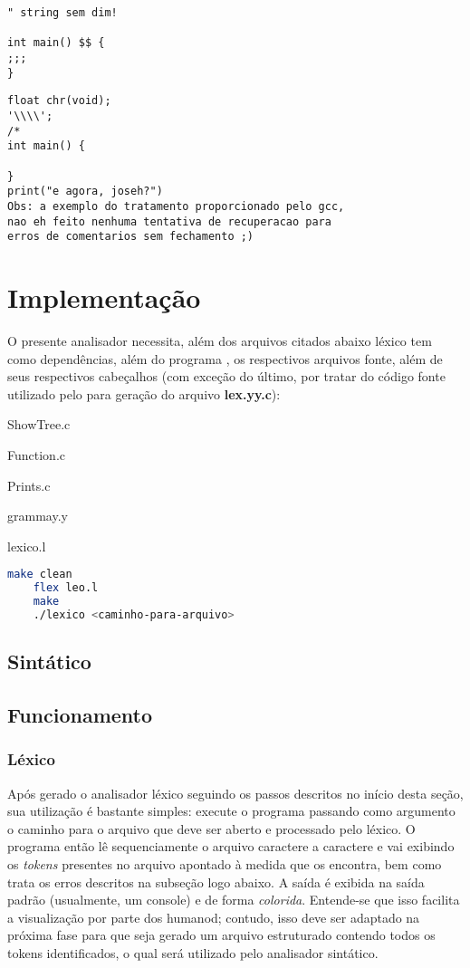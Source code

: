 \documentclass[
	article,			%
	11pt,				%
	oneside,			%
	a4paper,			%
	english,			%
	brazil,				%
	sumario=tradicional
	]{abntex2}
\begin{document}
\begin{lstlisting}[style=CStyle]
" string sem dim!

int main() $$ {
;;;
}
\end{lstlisting}

\begin{lstlisting}[style=CStyle]
float chr(void);
'\\\\';
/*
int main() {

}
print("e agora, joseh?")
Obs: a exemplo do tratamento proporcionado pelo gcc,
nao eh feito nenhuma tentativa de recuperacao para
erros de comentarios sem fechamento ;)
\end{lstlisting}



\section{Implementação}
O presente analisador necessita, além dos arquivos citados abaixo
 léxico tem como dependências, além do programa , os respectivos arquivos fonte, além de seus respectivos cabeçalhos (com exceção do último, por tratar do código fonte utilizado pelo  para geração do arquivo \textbf{lex.yy.c}):
	\begin{itemize}{
		\item{ShowTree.c}
		\item{Function.c}
		\item{Prints.c}
		\item{grammay.y}
		\item{lexico.l}
	}\end{itemize}
\begin{lstlisting}[language=bash,caption={bash version}]
	make clean
	flex leo.l
	make
	./lexico <caminho-para-arquivo>
\end{lstlisting}

\subsection{Sintático}


\subsection{Funcionamento}
\subsubsection{Léxico}
Após gerado o analisador léxico seguindo os passos descritos no início desta seção, sua utilização é bastante simples: execute o programa passando como argumento o caminho para o arquivo que deve ser aberto e processado pelo léxico. O programa então lê sequenciamente o arquivo caractere a caractere e vai exibindo os \textit{tokens} presentes no arquivo apontado à medida que os encontra, bem como trata os erros descritos na subseção logo abaixo.
A saída é exibida na saída padrão (usualmente, um console) e de forma \textit{colorida}. Entende-se que isso facilita a visualização por parte dos humanod; contudo, isso deve ser adaptado na próxima fase para que seja gerado um arquivo estruturado contendo todos os tokens identificados, o qual será utilizado pelo analisador sintático.
\end{document}
